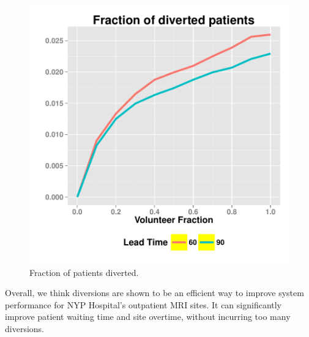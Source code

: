 \begin{figure}[htp]
\centering
\includegraphics[width=.6\textwidth]{chap3/numeric/pic/3sites_all_diversion}
\caption{Fraction of patients diverted.}
\label{fig:3sites_all_diversion}
\end{figure}

Overall, we think diversions are shown to be an efficient way to
improve system performance for NYP Hospital's outpatient MRI sites.
It can significantly improve patient waiting time and site overtime,
without incurring too many diversions.

